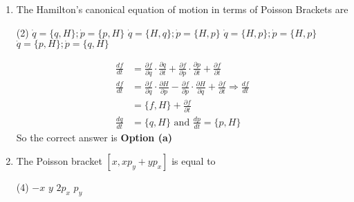 \begin{enumerate}
	{}
	\begin{tasks}(1)
		\task[\textbf{a.}] The total energy and total momentum are conserved
		\task[\textbf{b.}]Only the total energy is conserved
		\task[\textbf{c.}]The total energy and the $z$ - component of the total angular momentum are conserved
		\task[\textbf{d.}]  The total energy and total angular momentum are conserved
	\end{tasks}
\begin{answer}
	Solution: Lagrangian is not a function of time, so energy is conserved and component of $\left(\vec{r}_{1} \times \vec{r}_{2}\right)$ is only in $\hat{z}$ direction means potential is symmetric under $\phi$, so $L_{z}$ is conserved.\\
	So the correct answer is \textbf{Option (c)}
\end{answer}
	\item  The Hamilton's canonical equation of motion in terms of Poisson Brackets are
	{}
	\begin{tasks}(2)
		\task[\textbf{a.}]$\dot{q}=\{q, H\} ; \dot{p}=\{p, H\}$
		\task[\textbf{b.}]$\dot{q}=\{H, q\} ; \dot{p}=\{H, p\}$
		\task[\textbf{c.}]$\dot{q}=\{H, p\} ; \dot{p}=\{H, p\}$
		\task[\textbf{d.}] $\dot{q}=\{p, H\} ; \dot{p}=\{q, H\}$
	\end{tasks}
\begin{answer}
	\begin{align*}
	\frac{d f}{d t}&=\frac{\partial f}{\partial q} \cdot \frac{\partial q}{\partial t}+\frac{\partial f}{\partial p} \cdot \frac{\partial p}{\partial t}+\frac{\partial f}{\partial t}\\
	\frac{d f}{d t}&=\frac{\partial f}{\partial q} \cdot \frac{\partial H}{\partial p}-\frac{\partial f}{\partial p} \cdot \frac{\partial H}{\partial q}+\frac{\partial f}{\partial t} \Rightarrow \frac{d f}{d t}\\&=\{f, H\}+\frac{\partial f}{\partial t}\\
	\frac{d q}{d t}&=\{q, H\}\text{ and }\frac{d p}{d t}=\{p, H\}
	\end{align*}
	So the correct answer is \textbf{Option (a)}
\end{answer}
	\item  The Poisson bracket $\left[x, x p_{y}+y p_{x}\right]$ is equal to
	{}
	\begin{tasks}(4)
		\task[\textbf{a.}] $-x$
		\task[\textbf{b.}]$y$
		\task[\textbf{c.}]$2 p_{x}$
		\task[\textbf{d.}] $p_{y}$
	\end{tasks}

\end{enumerate}
